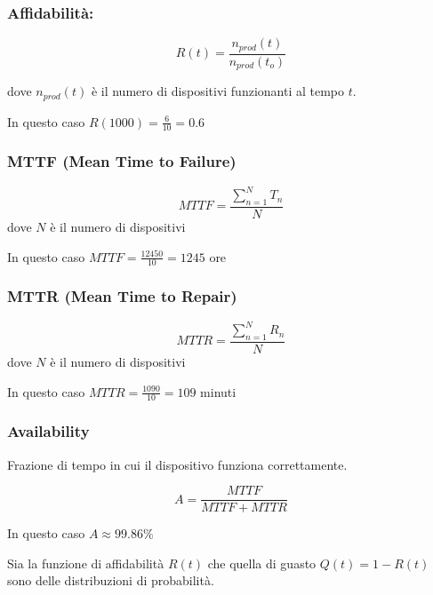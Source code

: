 \subsubsection*{Affidabilità:}

$$R(t) = \frac{n_{prod}(t)}{n_{prod}(t_o)}$$

dove $n_{prod}(t)$ è il numero di dispositivi funzionanti al tempo $t$.

\spacer
In questo caso $R(1000) = \frac{6}{10} = 0.6$

\subsubsection*{MTTF (Mean Time to Failure)}
$$MTTF = \frac{\sum_{n=1}^{N}T_n}{N}$$
dove $N$ è il numero di dispositivi

\spacer
In questo caso $MTTF = \frac{12450}{10} = 1245$ ore

\subsubsection*{MTTR (Mean Time to Repair)}
$$MTTR = \frac{\sum_{n=1}^{N}R_n}{N}$$
dove $N$ è il numero di dispositivi

\spacer
In questo caso $MTTR = \frac{1090}{10} = 109$ minuti

\subsubsection*{Availability}
Frazione di tempo in cui il dispositivo funziona correttamente.

$$A = \frac{MTTF}{MTTF + MTTR}$$

\spacer
In questo caso $A \approx 99.86\%$

\begin{note}
    Sia la funzione di affidabilità $R(t)$ che quella di guasto $Q(t) = 1-R(t)$ sono delle distribuzioni di probabilità.
\end{note}
